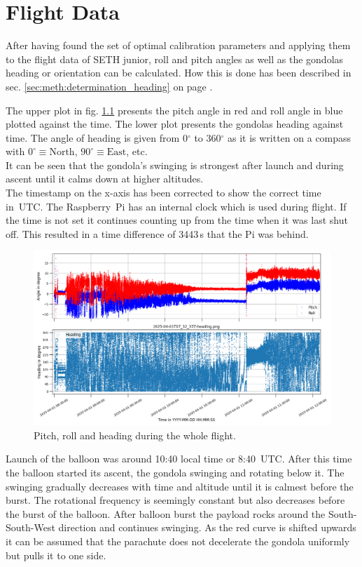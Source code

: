 \chapter{Flight Data \label{ch:flight_data}}
After having found the set of optimal calibration parameters and applying them to the flight data of \ac{SETH} junior, roll and pitch angles as well as the gondolas heading or orientation can be calculated. How this is done has been described in sec. \ref{sec:meth:determination_heading} on page \pageref{sec:meth:determination_heading}.

The upper plot in fig. \ref{fig:res:flight_heading} presents the pitch angle in red and roll angle in blue plotted against the time. The lower plot presents the gondolas heading against time. The angle of heading is given from 0$^\circ$ to 360$^\circ$ as it is written on a compass with $0^\circ\equiv\mathrm{North}$, $90^\circ\equiv\mathrm{East}$, etc.\\
It can be seen that the gondola's swinging is strongest after launch and during ascent until it calms down at higher altitudes.\\
The timestamp on the x-axis has been corrected to show the correct time in~UTC. The Raspberry~Pi has an internal clock which is used during flight. If the time is not set it continues counting up from the time when it was last shut off. This resulted in a time difference of 3443\,s that the Pi was behind.

\begin{figure}[H]
    \centering
    \includegraphics[width=\linewidth]{images/04_results/flight_heading.png}
    \caption{Pitch, roll and heading during the whole flight.}
    \label{fig:res:flight_heading}
\end{figure}

Launch of the balloon was around 10:40 local time or 8:40~UTC. After this time the balloon started its ascent, the gondola swinging and rotating below it. The swinging gradually decreases with time and altitude until it is calmest before the burst. The rotational frequency is seemingly constant but also decreases before the burst of the balloon. After balloon burst the payload rocks around the South-South-West direction and continues swinging. As the red curve is shifted upwards it can be assumed that the parachute does not decelerate the gondola uniformly but pulls it to one side.

